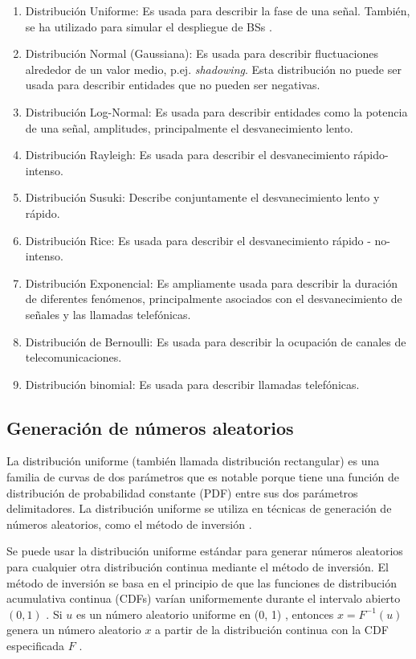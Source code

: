 \begin{enumerate}
    \item Distribución Uniforme: Es usada para describir la fase de una señal. También, se ha utilizado para simular el despliegue de BSs \parencite{TurjmanSmallCells}.
    \item Distribución Normal (Gaussiana): Es usada para describir fluctuaciones alrededor de un valor medio, p.ej. \textit{shadowing}. Esta distribución no puede ser usada para describir entidades que no pueden ser negativas.
    \item Distribución Log-Normal: Es usada para describir entidades como la potencia de una señal, amplitudes, principalmente el desvanecimiento lento.
    \item Distribución Rayleigh: Es usada para describir el desvanecimiento rápido-intenso.
    \item Distribución Susuki: Describe conjuntamente el desvanecimiento lento y rápido.
    \item Distribución Rice: Es usada para describir el desvanecimiento rápido - no-intenso.
    \item Distribución Exponencial: Es ampliamente usada para describir la duración de diferentes fenómenos, principalmente asociados con el desvanecimiento de señales y las llamadas telefónicas.
    \item Distribución de Bernoulli: Es usada para describir la ocupación de canales de telecomunicaciones.
    \item Distribución binomial: Es usada para describir llamadas telefónicas.
\end{enumerate}

\subsection{Generación de números aleatorios}

La distribución uniforme (también llamada distribución rectangular) es una familia de curvas de dos parámetros que es notable porque tiene una función de distribución de probabilidad constante (PDF) entre sus dos parámetros delimitadores. La distribución uniforme se utiliza en técnicas de generación de números aleatorios, como el método de inversión \parencite{ UniformMatlab}.\newline

Se puede usar la distribución uniforme estándar para generar números aleatorios para cualquier otra distribución continua mediante el método de inversión. El método de inversión se basa en el principio de que las funciones de distribución acumulativa continua (CDFs) varían uniformemente durante el intervalo abierto $(0, 1)$ . Si $u$ es un número aleatorio uniforme en (0, 1) , entonces $x = F^{ -1} ( u )$ genera un número aleatorio $x$ a partir de la distribución continua con la CDF especificada $F$ \parencite{UniformMatlab}.\newline

